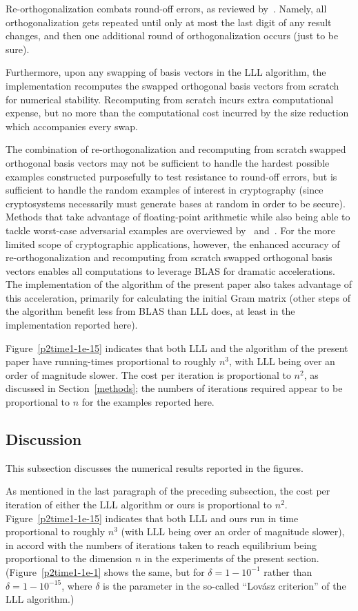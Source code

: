 \documentclass{article}
\begin{document}
Re-orthogonalization combats round-off errors,
as reviewed by~\cite{leon-bjorck-gander}.
Namely, all orthogonalization gets repeated until only at most the last digit
of any result changes, and then one additional round of orthogonalization
occurs (just to be sure).

Furthermore, upon any swapping of basis vectors in the LLL algorithm,
the implementation recomputes the swapped orthogonal basis vectors from scratch
for numerical stability. Recomputing from scratch incurs
extra computational expense, but no more than the computational cost incurred
by the size reduction which accompanies every swap.

The combination of re-orthogonalization and recomputing from scratch
swapped orthogonal basis vectors may not be sufficient to handle
the hardest possible examples constructed purposefully to test resistance
to round-off errors, but is sufficient to handle the random examples
of interest in cryptography (since cryptosystems necessarily
must generate bases at random in order to be secure).
Methods that take advantage of floating-point arithmetic
while also being able to tackle worst-case adversarial examples
are overviewed by~\cite{schnorr-euchner} and~\cite{stehle}.
For the more limited scope of cryptographic applications, however,
the enhanced accuracy of re-orthogonalization and recomputing from scratch
swapped orthogonal basis vectors enables all computations to leverage BLAS
for dramatic accelerations. The implementation of the algorithm
of the present paper also takes advantage of this acceleration,
primarily for calculating the initial Gram matrix
(other steps of the algorithm benefit less from BLAS than LLL does,
at least in the implementation reported here).

Figure~\ref{p2time1-1e-15} indicates that both LLL and the algorithm
of the present paper have running-times proportional to roughly $n^3$,
with LLL being over an order of magnitude slower.
The cost per iteration is proportional to $n^2$, as discussed
in Section~\ref{methods}; the numbers of iterations required appear
to be proportional to $n$ for the examples reported here.

\subsection{Discussion}
\label{discussion}

This subsection discusses the numerical results reported in the figures.

As mentioned in the last paragraph of the preceding subsection,
the cost per iteration of either the LLL algorithm or ours is proportional
to $n^2$. Figure~\ref{p2time1-1e-15} indicates that both LLL and ours
run in time proportional to roughly $n^3$
(with LLL being over an order of magnitude slower),
in accord with the numbers of iterations taken to reach equilibrium
being proportional to the dimension $n$ in the experiments
of the present section.
(Figure~\ref{p2time1-1e-1} shows the same, but for $\delta = 1 - 10^{-1}$
rather than $\delta = 1 - 10^{-15}$, where $\delta$ is the parameter
in the so-called ``Lov\'asz criterion'' of the LLL algorithm.)
\end{document}
